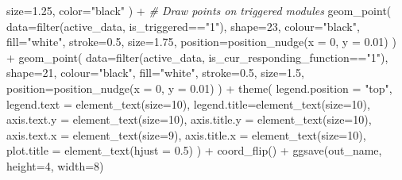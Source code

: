 \documentclass[
]{book}
\newenvironment{Shaded}{\begin{snugshade}}{\end{snugshade}}
\newcommand{\AttributeTok}[1]{\textcolor[rgb]{0.77,0.63,0.00}{#1}}
\newcommand{\CommentTok}[1]{\textcolor[rgb]{0.56,0.35,0.01}{\textit{#1}}}
\newcommand{\DecValTok}[1]{\textcolor[rgb]{0.00,0.00,0.81}{#1}}
\newcommand{\FloatTok}[1]{\textcolor[rgb]{0.00,0.00,0.81}{#1}}
\newcommand{\FunctionTok}[1]{\textcolor[rgb]{0.00,0.00,0.00}{#1}}
\newcommand{\NormalTok}[1]{#1}
\newcommand{\SpecialCharTok}[1]{\textcolor[rgb]{0.00,0.00,0.00}{#1}}
\newcommand{\StringTok}[1]{\textcolor[rgb]{0.31,0.60,0.02}{#1}}
\begin{document}
\begin{Shaded}
\begin{Highlighting}[]
    \AttributeTok{size=}\FloatTok{1.25}\NormalTok{,}
    \AttributeTok{color=}\StringTok{"black"}
\NormalTok{  ) }\SpecialCharTok{+}
  \CommentTok{\# Draw points on triggered modules}
  \FunctionTok{geom\_point}\NormalTok{(}
    \AttributeTok{data=}\FunctionTok{filter}\NormalTok{(active\_data, is\_triggered}\SpecialCharTok{==}\StringTok{"1"}\NormalTok{),}
    \AttributeTok{shape=}\DecValTok{23}\NormalTok{,}
    \AttributeTok{colour=}\StringTok{"black"}\NormalTok{,}
    \AttributeTok{fill=}\StringTok{"white"}\NormalTok{,}
    \AttributeTok{stroke=}\FloatTok{0.5}\NormalTok{,}
    \AttributeTok{size=}\FloatTok{1.75}\NormalTok{,}
    \AttributeTok{position=}\FunctionTok{position\_nudge}\NormalTok{(}\AttributeTok{x =} \DecValTok{0}\NormalTok{, }\AttributeTok{y =} \FloatTok{0.01}\NormalTok{)}
\NormalTok{  ) }\SpecialCharTok{+}
  \FunctionTok{geom\_point}\NormalTok{(}
    \AttributeTok{data=}\FunctionTok{filter}\NormalTok{(active\_data, is\_cur\_responding\_function}\SpecialCharTok{==}\StringTok{"1"}\NormalTok{),}
    \AttributeTok{shape=}\DecValTok{21}\NormalTok{,}
    \AttributeTok{colour=}\StringTok{"black"}\NormalTok{,}
    \AttributeTok{fill=}\StringTok{"white"}\NormalTok{,}
    \AttributeTok{stroke=}\FloatTok{0.5}\NormalTok{,}
    \AttributeTok{size=}\FloatTok{1.5}\NormalTok{,}
    \AttributeTok{position=}\FunctionTok{position\_nudge}\NormalTok{(}\AttributeTok{x =} \DecValTok{0}\NormalTok{, }\AttributeTok{y =} \FloatTok{0.01}\NormalTok{)}
\NormalTok{  ) }\SpecialCharTok{+}
  \FunctionTok{theme}\NormalTok{(}
    \AttributeTok{legend.position =} \StringTok{"top"}\NormalTok{,}
    \AttributeTok{legend.text =} \FunctionTok{element\_text}\NormalTok{(}\AttributeTok{size=}\DecValTok{10}\NormalTok{),}
    \AttributeTok{legend.title=}\FunctionTok{element\_text}\NormalTok{(}\AttributeTok{size=}\DecValTok{10}\NormalTok{),}
    \AttributeTok{axis.text.y =} \FunctionTok{element\_text}\NormalTok{(}\AttributeTok{size=}\DecValTok{10}\NormalTok{),}
    \AttributeTok{axis.title.y =} \FunctionTok{element\_text}\NormalTok{(}\AttributeTok{size=}\DecValTok{10}\NormalTok{),}
    \AttributeTok{axis.text.x =} \FunctionTok{element\_text}\NormalTok{(}\AttributeTok{size=}\DecValTok{9}\NormalTok{),}
    \AttributeTok{axis.title.x =} \FunctionTok{element\_text}\NormalTok{(}\AttributeTok{size=}\DecValTok{10}\NormalTok{),}
    \AttributeTok{plot.title =} \FunctionTok{element\_text}\NormalTok{(}\AttributeTok{hjust =} \FloatTok{0.5}\NormalTok{)}
\NormalTok{  ) }\SpecialCharTok{+}
  \FunctionTok{coord\_flip}\NormalTok{() }\SpecialCharTok{+}
  \FunctionTok{ggsave}\NormalTok{(out\_name, }\AttributeTok{height=}\DecValTok{4}\NormalTok{, }\AttributeTok{width=}\DecValTok{8}\NormalTok{)}
\end{Highlighting}
\end{Shaded}
\end{document}
